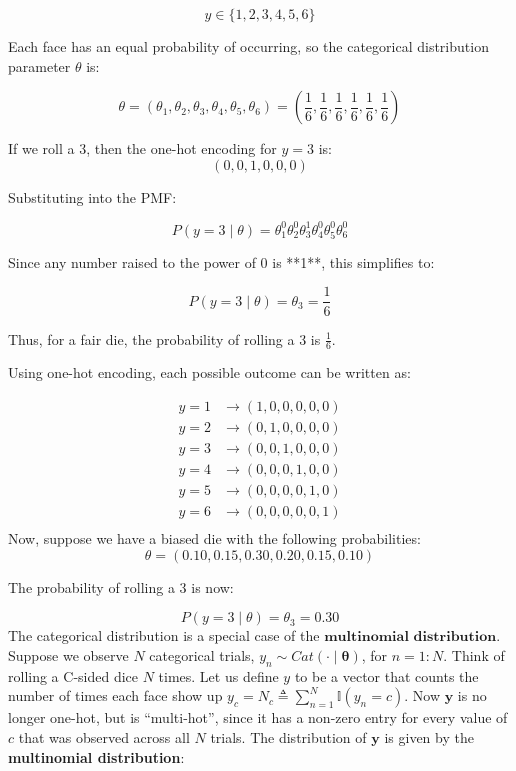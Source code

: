 \documentclass[10pt,landscape]{article}
\newcommand{\parameter}{\boldsymbol{\theta}}
\begin{document}
\begin{multicols*}{3}
\[
y \in \{1, 2, 3, 4, 5, 6\}
\]

Each face has an equal probability of occurring, so the categorical distribution parameter \( \theta \) is:

\[
\theta = (\theta_1, \theta_2, \theta_3, \theta_4, \theta_5, \theta_6) = \left( \frac{1}{6}, \frac{1}{6}, \frac{1}{6}, \frac{1}{6}, \frac{1}{6}, \frac{1}{6} \right)
\]

If we roll a 3, then the one-hot encoding for \( y = 3 \) is:
\[
(0, 0, 1, 0, 0, 0)
\]

Substituting into the PMF:

\[
P(y = 3 \mid \theta) = \theta_1^0 \theta_2^0 \theta_3^1 \theta_4^0 \theta_5^0 \theta_6^0
\]

Since any number raised to the power of 0 is **1**, this simplifies to:

\[
P(y = 3 \mid \theta) = \theta_3 = \frac{1}{6}
\]

Thus, for a fair die, the probability of rolling a 3 is \( \frac{1}{6} \).

Using one-hot encoding, each possible outcome can be written as:

\[
\begin{aligned}
y = 1 &\rightarrow (1,0,0,0,0,0) \\
y = 2 &\rightarrow (0,1,0,0,0,0) \\
y = 3 &\rightarrow (0,0,1,0,0,0) \\
y = 4 &\rightarrow (0,0,0,1,0,0) \\
y = 5 &\rightarrow (0,0,0,0,1,0) \\
y = 6 &\rightarrow (0,0,0,0,0,1) \\
\end{aligned}
\]
Now, suppose we have a biased die with the following probabilities:
\[
\theta = (0.10, 0.15, 0.30, 0.20, 0.15, 0.10)
\]

The probability of rolling a 3 is now:

\[
P(y = 3 \mid \theta) = \theta_3 = 0.30
\]
The categorical distribution is a special case of the $\textbf{multinomial distribution}$. Suppose we observe $N$ categorical trials, $y_n \sim Cat(\cdot\mid\parameter)$, for $n = 1 : N$. Think of rolling a C-sided dice $N$ times. Let us define $y$ to be a vector that counts the number of times each face show up
\( y_c = N_c \triangleq \sum_{n=1}^{N} \mathbb{I} (y_n = c) \). Now \( \mathbf{y} \) is no longer one-hot, but is ``multi-hot'', since it has a non-zero entry for every value of \( c \) that was observed across all \( N \) trials. The distribution of \( \mathbf{y} \) is given by the \textbf{multinomial distribution}:


\end{multicols*}
\end{document}
